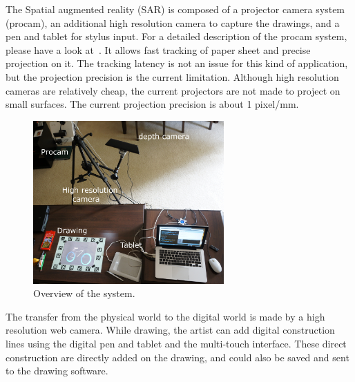 \documentclass{article}
\begin{document}
The Spatial augmented reality (SAR) is composed of a projector camera system (procam), an additional high resolution camera to capture the drawings, and a pen and tablet for stylus input. For a detailed description of the procam system, please have a look at~\cite{laviole:2012}. It allows fast tracking of paper sheet and precise projection on it. The tracking latency is not an issue for this kind of application, but the projection precision is the current limitation. Although high resolution cameras are relatively cheap, the current projectors are not made to project on small surfaces. The current projection precision is about 1 pixel/mm. 


\begin{figure}[tb]
\includegraphics[width = 73mm]{DSC00299-2-rogne-annote.JPG}
\caption{Overview of the system.} 
\label{fig:setup}
\end{figure}

The transfer from the physical world to the digital world is made by a high resolution web camera. 
While drawing, the artist can add digital construction lines using the digital pen and tablet and the multi-touch interface. These direct construction are directly added on the drawing, and could also be saved and sent to the drawing software.  


\end{document}

